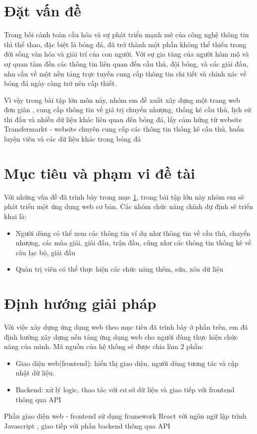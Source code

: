 \documentclass[../BTL.tex]{subfiles}
\begin{document}
\section{Đặt vấn đề}
\label{section:chap1-dat-van-de}
Trong bối cảnh toàn cầu hóa và sự phát triển mạnh mẽ của công nghệ thông tin thì thể thao, đặc biệt là bóng đá, đã trở thành một phần không thể thiếu trong đời sống văn hóa và giải trí của con người. Với sự gia tăng của người hâm mộ và sự quan tâm đến các thông tin liên quan đến cầu thủ, đội bóng, và các giải đấu, nhu cầu về một nền tảng trực tuyến cung cấp thông tin chi tiết và chính xác về bóng đá ngày càng trở nên cấp thiết.

Vì vậy trong bài tập lớn môn này, nhóm em đề xuất xây dựng một trang web đơn giản , cung cấp thông tin về giá trị chuyển nhượng, thống kê cầu thủ, lịch sử thi đấu và nhiều dữ liệu khác liên quan đến bóng đá, lấy cảm hứng từ website Transfermarkt - website chuyên cung cấp các thông tin thống kê cầu thủ, huấn luyện viên và các dữ liệu khác trong bóng đá
\section{Mục tiêu và phạm vi đề tài}
Với những vấn đề đã trình bày trong mục \ref{section:chap1-dat-van-de}, trong bài tập lớn này nhóm em sẽ phát triển một ứng dụng web cơ bản. Các nhóm chức năng chính dự định sẽ triển khai là:
\begin{itemize}
    \item Người dùng có thể xem các thông tin ví dụ như thông tin về cầu thủ, chuyển nhượng, các mùa giải, giải đấu, trận đấu, cũng như các thông tin thống kê về câu lạc bộ, giải đấu
    \item Quản trị viên có thể thực hiện các chức năng thêm, sửa, xóa dữ liệu
\end{itemize}
\section{Định hướng giải pháp}
Với việc xây dựng ứng dụng web theo mục tiêu đã trình bày ở phần trên, em đã định hướng xây dựng nền tảng ứng dụng web
cho người dùng thực hiện chức năng của mình. Mã nguồn của hệ
thống sẽ được chia làm 2 phần:
\begin{itemize}
    \item Giao diện web(frontend): hiển thị giao diện, người dùng tương tác và cập nhật dữ liệu.
    \item Backend: xử lý logic, thao tác với cơ sở dữ liệu và giao tiếp với frontend thông qua API 
\end{itemize}
Phần giao diện web - frontend sử dụng framework React với ngôn ngữ lập trình Javascript , giao tiếp với phần backend thông qua API
\end{document}
